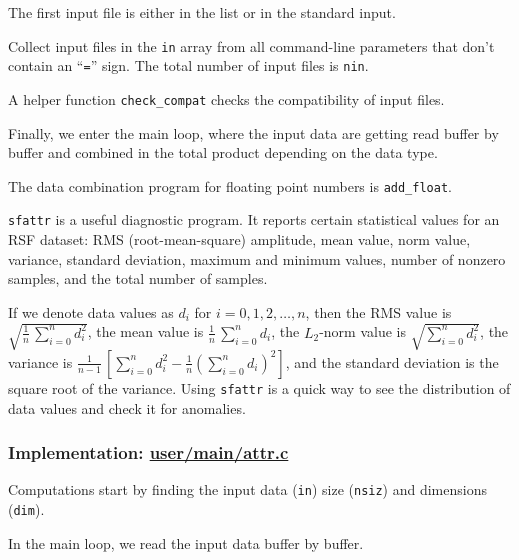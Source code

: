 The first input file is either in the list or in the standard input.

Collect input files in the \texttt{in} array from all command-line
parameters that don't contain an ``\texttt{=}'' sign. The total number
of input files is \texttt{nin}.

A helper function \texttt{check\_compat} checks the compatibility of
input files.

Finally, we enter the main loop, where the input data are getting read
buffer by buffer and combined in the total product depending on the
data type.  

The data combination program for floating point numbers is
\texttt{add\_float}.  

\noindent\doublebox{\parbox{\textwidth}{

}}

\texttt{sfattr} is a useful diagnostic program. It reports certain
statistical values for an RSF dataset: RMS (root-mean-square)
amplitude, mean value, norm value, variance, standard deviation,
maximum and minimum values, number of nonzero samples, and the total
number of samples.

If we denote data values as $d_i$ for $i=0,1,2,\ldots,n$, then the RMS
value is $\sqrt{\frac{1}{n}\,\sum\limits_{i=0}^n d_i^2}$, the mean
value is $\frac{1}{n}\,\sum\limits_{i=0}^n d_i$, the $L_2$-norm value
is $\sqrt{\sum\limits_{i=0}^n d_i^2}$, the variance is
$\frac{1}{n-1}\,\left[\sum\limits_{i=0}^n d_i^2 - \frac{1}{n}\left(\sum\limits_{i=0}^n d_i\right)^2\right]$, and the standard
deviation is the square root of the variance. Using \texttt{sfattr}
is a quick way to see the distribution of data values and check it for
anomalies.

\subsubsection{Implementation: \href{http://rsf.svn.sourceforge.net/viewvc/rsf/trunk/user/main/attr.c?view=markup}{user/main/attr.c}}

Computations start by finding the input data (\texttt{in}) size
(\texttt{nsiz}) and dimensions (\texttt{dim}).

In the main loop, we read the input data buffer by buffer.

